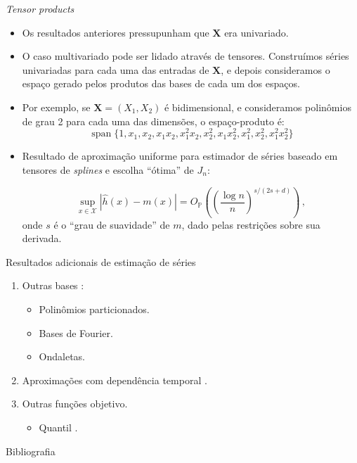 \documentclass[11pt]{beamer}
\begin{document}
	\begin{frame}{\textit{Tensor products}}
		\begin{itemize}
			\item Os resultados anteriores pressupunham que $\boldsymbol{X}$ era univariado.
			\item O caso multivariado pode ser lidado através de tensores. Construímos séries univariadas para cada uma das entradas de $\boldsymbol{X}$, e depois consideramos o espaço gerado pelos produtos das bases de cada um dos espaços.
			\item Por exemplo, se $\boldsymbol{X} = (X_1,X_2)$ é bidimensional, e consideramos polinômios de grau 2 para cada uma das dimensões, o espaço-produto é:
			$$\operatorname{span}\{1, x_1,x_2, x_1 x_2, x_1^2 x_2, x_2^2, x_1 x_2^2, x_1^2, x_2^2, x_1^2 x_2^2\}$$
			\item Resultado de aproximação uniforme para estimador de séries baseado em tensores de \textit{splines} \citep{belloni2015some} e escolha ``ótima'' de $J_n$:
			
			$$\sup _{x \in \mathcal{X}}|\widehat{h}(x)-m(x)| = O_{\mathbb{P}}\left(\left(\frac{\log n}{n}\right)^{s /(2 s+d)}\right)\, ,$$
			onde $s$ é o ``grau de suavidade'' de $m$, dado pelas restrições sobre sua derivada.
		\end{itemize}	\end{frame}
	\begin{frame}{Resultados adicionais de estimação de séries}
\begin{enumerate}
	\item Outras bases \citep[veja][]{chen2007,belloni2015some,cattaneo2020large}:
	\begin{itemize}
		\item Polinômios particionados.
		\item Bases de Fourier.
		\item Ondaletas.
	\end{itemize}
	\item Aproximações com dependência temporal \citep{Chen2015}.
	\item Outras funções objetivo.
	\begin{itemize}
		\item Quantil  \citep{belloni2019conditional}.
	\end{itemize}
\end{enumerate}
	\end{frame}
	\appendix
		\begin{frame}[allowframebreaks]{Bibliografia}
	\printbibliography

	\end{frame}
\end{document}
